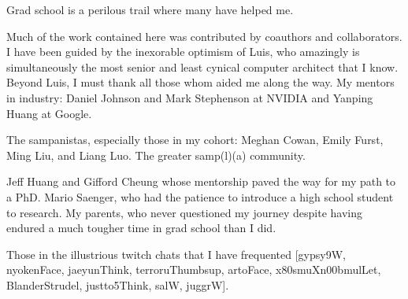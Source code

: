 Grad school is a perilous trail where many have helped me.

Much of the work contained here was contributed by coauthors and collaborators.
I have been guided by the inexorable optimism of Luis, who amazingly is simultaneously the most senior and least cynical computer architect that I know.
Beyond Luis, I must thank all those whom aided me along the way.
My mentors in industry: Daniel Johnson and Mark Stephenson at NVIDIA and Yanping Huang at Google.

The sampanistas, especially those in my cohort: Meghan Cowan, Emily Furst, Ming Liu, and Liang Luo.
The greater samp(l)(a) community.

Jeff Huang and Gifford Cheung whose mentorship paved the way for my path to a PhD.
Mario Saenger, who had the patience to introduce a high school student to research.
My parents, who never questioned my journey despite having endured a much tougher time in grad school than I did.

Those in the illustrious twitch chats that I have frequented [gypsy9W, nyokenFace, jaeyunThink, terroruThumbsup, artoFace, x80smuXn00bmulLet, BlanderStrudel, justto5Think, salW, juggrW].
